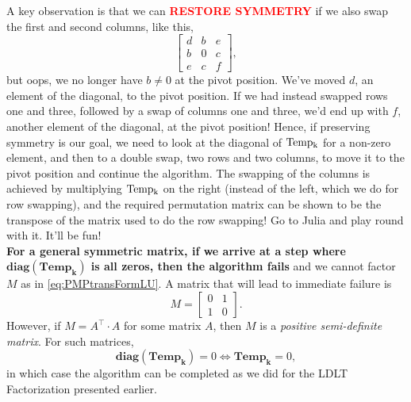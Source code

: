 \begin{tcolorbox}[title=  \textbf{\RED \large Destroyed Symmetry!}]
 A key observation is that we can  \textcolor{red}{\bf RESTORE SYMMETRY} if we also swap the first and second columns,  like this,
 \begin{equation}
    \label{eq:SymmetricMStep4b}
  \left[\begin{array}{ccc}
    d & b & e\\
   b& 0 & c\\
   e & c & f
   \end{array}\right],
\end{equation}
but oops, we no longer have $b\neq 0$ at the pivot position. We've moved $d$, an element of the diagonal, to the pivot position. If we had instead swapped rows one and three, followed by a swap of columns one and three, we'd end up with $f$, another element of the diagonal, at the pivot position! Hence, if preserving symmetry is our goal, we need to look at the diagonal of ${\rm Temp_k}$ for a non-zero element, and then to a double swap, two rows and two columns, to move it to the pivot position and continue the algorithm. The swapping of the columns is achieved by multiplying ${\rm Temp_k}$ on the right (instead of the left, which we do for row swapping), and the required permutation matrix can be shown to be the transpose of the matrix used to do the row swapping! Go to Julia and play round with it. It'll be fun! \\

\textbf{For a general symmetric matrix, if we arrive at a step where $\mathbf{diag}( \mathbf{Temp}_\mathbf{k})$ is all zeros, then the algorithm fails} and we cannot factor $M$ as
in \eqref{eq:PMPtransFormLU}. A matrix that will lead to immediate failure is
 \begin{equation}
   \label{eq:SymmetricBadMatrix}
   M=\left[\begin{array}{cc}
    0 & 1\\
  1 & 0
   \end{array}\right].
\end{equation}
However, if $M=A^\top \cdot A$ for some matrix $A$, then $M$ is a \textit{positive semi-definite matrix}. For such matrices, $$\mathbf{diag}( \mathbf{Temp}_\mathbf{k}) =0 \iff \mathbf{Temp}_\mathbf{k} = 0,$$
in which case the algorithm can be completed as we did for the LDLT Factorization presented earlier.
\end{tcolorbox}  

\vspace*{0.5cm}

